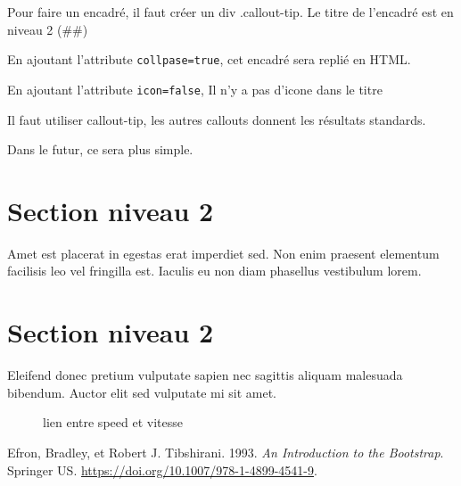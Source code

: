 \documentclass[
  9pt,
  a4paper,
  DIV=11]{scrreprt}
\newlength{\cslhangindent}
\newenvironment{CSLReferences}[2] %
 {\begin{list}{}{%
  \setlength{\itemindent}{0pt}
  \setlength{\leftmargin}{0pt}
  \setlength{\parsep}{0pt}
  \ifodd #1
   \setlength{\leftmargin}{\cslhangindent}
   \setlength{\itemindent}{-1\cslhangindent}
  \fi
  \setlength{\itemsep}{#2\baselineskip}}}
 {\end{list}}
\begin{document}
\begin{tcolorbox}[enhanced jigsaw, toptitle=1mm, colframe=quarto-callout-tip-color-frame, bottomrule=.15mm, opacitybacktitle=0.6, breakable, colback=white, leftrule=.75mm, arc=.35mm, bottomtitle=1mm, title={les encadrés}, titlerule=0mm, rightrule=.15mm, toprule=.15mm, colbacktitle=quarto-callout-tip-color!10!white, opacityback=0, coltitle=black, left=2mm]

Pour faire un encadré, il faut créer un div .callout-tip. Le titre de
l'encadré est en niveau 2 (\#\#)

En ajoutant l'attribute \texttt{collpase=true}, cet encadré sera replié
en HTML.

En ajoutant l'attribute \texttt{icon=false}, Il n'y a pas d'icone dans
le titre

Il faut utiliser callout-tip, les autres callouts donnent les résultats
standards.

Dans le futur, ce sera plus simple.

\end{tcolorbox}

\section{Section niveau 2}\label{sec-ca-continue}

Amet est placerat in egestas erat imperdiet sed. Non enim praesent
elementum facilisis leo vel fringilla est. Iaculis eu non diam phasellus
vestibulum lorem.

\section{Section niveau 2}\label{sec-encoreetencore}

Eleifend donec pretium vulputate sapien nec sagittis aliquam malesuada
bibendum. Auctor elit sed vulputate mi sit amet.

\begin{figure}

\caption{\label{fig-test}lien entre speed et vitesse}


\end{figure}%

\label{refs}
\begin{CSLReferences}{1}{0}
Efron, Bradley, et Robert J. Tibshirani. 1993. \emph{An Introduction to
the Bootstrap}. Springer US.
\url{https://doi.org/10.1007/978-1-4899-4541-9}.

\end{CSLReferences}
\end{document}
